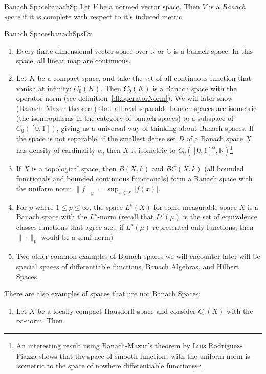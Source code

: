 \documentclass[oneside]{book}
\newcommand{\R}{\mathbb{R}}
\newcommand{\C}{\mathbb{C}}
\begin{document}
\begin{defn}{Banach Space}{banachSp}
	Let $V$ be a normed vector space. Then $V$ is a \emph{Banach space} if it is complete with respect to it's induced
	metric.
\end{defn}

\begin{example}{Banach Spaces}{banachSpsEx}
	\begin{enumerate}
		\item Every finite dimensional vector space over $\R$ or $\C$ is a banach space. In this space, all linear map
			are continuous.
		\item Let $K$ be a compact space, and take the set of all continuous function that vanish at
			infinity: $C_0(K)$. Then $C_0(K)$ is a Banach space with the operator norm (see
			definition~\ref{df:operatorNorm}). We will later show (Banach–Mazur theorem) that all real separable banach spaces are isometric
			(the isomrophisms in the category of banach spaces) to a subspace of $C_0([0,1])$, giving us a universal way of thinking
			about Banach spaces. If the space is not separable, if the smallest dense set $D$ of a Banach space $X$ has density
			of cardinality $\alpha$, then $X$ is isometric to $C_0([0,1]^\alpha, \R)$\footnote{An interesting result
			using Banach-Mazur's theorem by Luis Rodr\'iguez-Piazza shows that the space of smooth functions with the
			uniform norm is isometric to the space of nowhere differentiable functions}
		\item If $X$ is a topological space, then $B(X, k)$ and $BC(X, k)$ (all bounded functionals and bounded
			continuous funcitonals) form a Banach space with the uniform norm $\|f\|_u = \sup_{x \in X}|f(x)|$.
		\item For $p$ where $1 \le p \le \infty$, the space $L^p(X)$ for some measurable space $X$ is a Banach space
			with the $L^p$-norm (recall that $L^p(\mu)$ is the set of equivalence classes functions that agree a.e.; if
			$L^p(\mu)$ represented only functions, then $\|\cdot\|_p$ would be a semi-norm)
		\item Two other common examples of Banach spaces we will encounter later will be special spaces of
			differentiable functions, Banach Algebras, and Hilbert Spaces.
	\end{enumerate}
	There are also examples of spaces that are not Banach Spaces:
	\begin{enumerate}
		\item Let $X$ be a locally compact Hausdorff space and consider $C_c(X)$ with the $\infty$-norm. Then

\end{enumerate}
\end{example}
\end{document}
